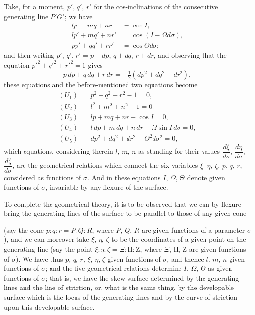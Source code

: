 \documentclass[11pt,a4paper,english]{article}
\theoremstyle{plain}
\begin{document}
Take, for a moment, $p'$, $q'$, $r'$ for the cos-inclinations of the consecutive generating line $P'G'$; we have
\begin{align*}
lp\; + mq + nr &= \cos I, \\
lp' + mq' + nr' &= \cos(I - \Omega d\sigma), \\
pp' + qq' + rr' &= \cos \Theta d\sigma;
\end{align*}
and then writing $p'$, $q'$, $r' = p + dp$, $q + dq$, $r + dr$, and observing that the equation $p'^2 + q'^2 + r'^2 = 1$ gives
\[
p\,dp + q\,dq + r\,dr = -\tfrac{1}{2}(dp^2 + dq^2 + dr^2),
\]
these equations and the before-mentioned two equations become
\begin{align*}
(U_1)\quad &p^2 + q^2 + r^2 - 1 = 0, \\
(U_2)\quad &l^2 + m^2 + n^2 - 1 = 0, \\
(U_3)\quad &lp + mq + nr - \cos I = 0, \\
(U_4)\quad &l\,dp + m\,dq + n\,dr - \Omega \sin I\,d\sigma = 0, \\
(U_5)\quad &dp^2 + dq^2 + dr^2 - \Theta^2 d\sigma^2 = 0,
\end{align*}
which equations, considering therein $l$, $m$, $n$ as standing for their values $\dfrac{d\xi}{d\sigma}$, $\dfrac{d\eta}{d\sigma}$, $\dfrac{d\zeta}{d\sigma}$, are the geometrical relations which connect the six variables $\xi$, $\eta$, $\zeta$, $p$, $q$, $r$, considered as functions of $\sigma$. And in these equations $I$, $\Omega$, $\Theta$ denote given functions of $\sigma$, invariable by any flexure of the surface.

To complete the geometrical theory, it is to be observed that we can by flexure bring the generating lines of the surface to be parallel to those of any given cone

\newpage
\noindent (say the cone $p : q : r = P : Q : R$, where $P$, $Q$, $R$ are given functions of a parameter $\sigma$), and we can moreover take $\xi$, $\eta$, $\zeta$ to be the coordinates of a given point on the generating line (say the point $\xi : \eta : \zeta = \Xi : \mathrm{H} : \mathrm{Z}$, where $\Xi$, $\mathrm{H}$, $\mathrm{Z}$ are given functions of $\sigma$). We have thus $p$, $q$, $r$, $\xi$, $\eta$, $\zeta$ given functions of $\sigma$, and thence $l$, $m$, $n$ given functions of $\sigma$; and the five geometrical relations determine $I$, $\Omega$, $\Theta$ as given functions of $\sigma$; that is, we have the skew surface determined by the generating lines and the line of striction, or, what is the same thing, by the developable surface which is the locus of the generating lines and by the curve of striction upon this developable surface.
\end{document}
